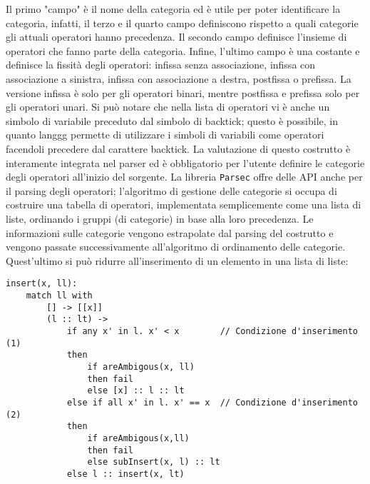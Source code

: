 \documentclass[10pt,a4paper]{article}
\begin{document}
Il primo "campo" è il nome della categoria ed è utile per poter identificare la categoria, infatti, il terzo e il
quarto campo definiscono rispetto a quali categorie gli attuali operatori hanno precedenza. Il secondo campo definisce
l'insieme di operatori che fanno parte della categoria. Infine, l'ultimo campo è una costante e definisce la fissità
degli operatori: infissa senza associazione, infissa con associazione a sinistra, infissa con associazione a destra,
postfissa o prefissa. La versione infissa è solo per gli operatori binari, mentre postfissa e prefissa solo per gli
operatori unari. Si può notare che nella lista di operatori vi è anche un simbolo di variabile preceduto dal simbolo
di backtick; questo è possibile, in quanto langgg permette di utilizzare i simboli di variabili come operatori
facendoli precedere dal carattere backtick. La valutazione di questo costrutto è interamente integrata nel parser ed
è obbligatorio per l'utente definire le categorie degli operatori all'inizio del sorgente. La libreria \texttt{Parsec}
offre delle API anche per il parsing degli operatori; l'algoritmo di gestione delle categorie si occupa di costruire
una tabella di operatori, implementata semplicemente come una lista di liste, ordinando i gruppi (di categorie) in
base alla loro precedenza. Le informazioni sulle categorie vengono estrapolate dal parsing del costrutto e vengono
passate successivamente all'algoritmo di ordinamento delle categorie. Quest'ultimo si può ridurre all'inserimento
di un elemento in una lista di liste:

\begin{lstlisting}
insert(x, ll):
    match ll with
        [] -> [[x]]
        (l :: lt) ->
            if any x' in l. x' < x        // Condizione d'inserimento (1)
            then
                if areAmbigous(x, ll)
                then fail
                else [x] :: l :: lt
            else if all x' in l. x' == x  // Condizione d'inserimento (2)
            then
                if areAmbigous(x,ll)
                then fail
                else subInsert(x, l) :: lt
            else l :: insert(x, lt)
\end{lstlisting}
\end{document}
